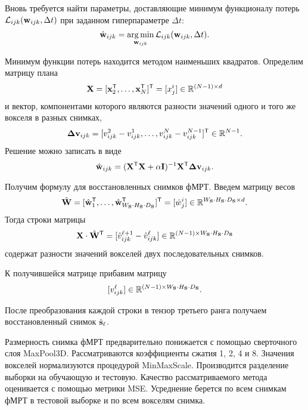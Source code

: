 \documentclass[a4paper, 12pt]{article}
\begin{document}
	Вновь требуется найти параметры, доставляющие минимум функционалу потерь $\mathcal{L}_{ijk}(\mathbf{w}_{ijk}, \Delta t)$
	при заданном гиперпараметре $\Delta t$:
	\begin{equation}
		\label{eq17}
		\hat{\mathbf{w}}_{ijk} = \operatorname*{arg\,min}_{\mathbf{w}_{ijk}} \mathcal{L}_{ijk}(\mathbf{w}_{ijk}, \Delta t).
	\end{equation}

	Минимум функции потерь находится методом наименьших квадратов. Определим матрицу плана
	\begin{equation}
		\label{eq18}
		\mathbf{X} = [\mathbf{x}_2^{\mathsf{T}}, \ldots, \mathbf{x}_N^{\mathsf{T}}]^{\mathsf{T}} = [x^i_j] \in \mathbb{R}^{(N-1) \times d}
	\end{equation}
	и вектор, компонентами которого являются разности значений одного и того же вокселя в разных снимках,
	\begin{equation}
		\label{eq19}
		\mathbf{\Delta v}_{ijk} = [v^2_{ijk} - v^1_{ijk}, \ldots, v^N_{ijk} - v^{N-1}_{ijk}]^{\mathsf{T}} \in \mathbb{R}^{N-1}.
	\end{equation}
	Решение можно записать в виде
	\begin{equation}
		\label{eq20}
		\hat{\mathbf{w}}_{ijk} = (\mathbf{X}^{\mathsf{T}} \mathbf{X} + \alpha \mathbf{I})^{-1} \mathbf{X}^{\mathsf{T}} \mathbf{\Delta v}_{ijk}.
	\end{equation}

	Получим формулу для восстановленных снимков фМРТ. Введем матрицу весов
	\begin{equation}
		\label{eq21}
		\hat{\mathbf{W}} = [\hat{\mathbf{w}}_1^{\mathsf{T}}, \ldots, \hat{\mathbf{w}}_{W_{\mathbf{S}} \cdot H_{\mathbf{S}} \cdot D_{\mathbf{S}}}^{\mathsf{T}}]^{\mathsf{T}} = [\hat{w}^i_j] \in \mathbb{R}^{W_{\mathbf{S}} \cdot H_{\mathbf{S}} \cdot D_{\mathbf{S}} \times d}.
	\end{equation}
	Тогда строки матрицы
	\begin{equation}
		\label{eq22}
		\mathbf{X} \cdot \hat{\mathbf{W}}^{\mathsf{T}} = [\hat{v}^{\ell+1}_{ijk} - \hat{v}^{\ell}_{ijk}] \in \mathbb{R}^{(N-1) \times W_{\mathbf{S}} \cdot H_{\mathbf{S}} \cdot D_{\mathbf{S}}}
	\end{equation}
	содержат разности значений вокселей двух последовательных снимков. 
	
	К получившейся матрице прибавим матрицу
	\begin{equation}
		\label{eq23}
		[v^{\ell}_{ijk}] \in \mathbb{R}^{(N-1) \times W_{\mathbf{S}} \cdot H_{\mathbf{S}} \cdot D_{\mathbf{S}}}.
	\end{equation}
	
	После преобразования каждой строки в тензор третьего ранга получаем восстановленный снимок $\hat{\mathbf{s}}_{\ell}$.

	Размерность снимка фМРТ предварительно понижается с помощью сверточного слоя MaxPool3D.
	Рассматриваются коэффициенты сжатия 1, 2, 4 и 8.
	Значения вокселей нормализуются процедурой MinMaxScale.
	Производится разделение выборки на обучающую и тестовую.
	Качество рассматриваемого метода оценивается с помощью метрики MSE.
	Усреднение берется по всем снимкам фМРТ в тестовой выборке и по всем вокселям снимка.
\end{document}
